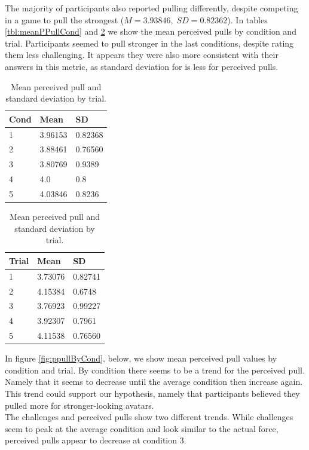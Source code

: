 
The majority of participants also reported pulling differently, despite competing in a game to pull the strongest ($ M=3.93846,\; SD=0.82362 $). In tables \ref{tbl:meanPPullCond} and \ref{tbl:meanPPullTrial} we show the mean perceived pulls by condition and trial. Participants seemed to pull stronger in the last conditions, despite rating them less challenging. It appears they were also more consistent with their answers in this metric, as standard deviation for is less for perceived pulls.

\begin{table}[H]
 \captionsetup{justification=centering,margin=0.1cm}
 \begin{minipage}{.5\linewidth}
     \centering
\begin{tabular}{|lll|}
\hline
Cond & Mean & SD \\
\hline
1 &  3.96153 & 0.82368\\  
2 &  3.88461 & 0.76560\\ 
3 &  3.80769 & 0.9389\\ 
4 &  4.0 & 0.8\\  
5 & 4.03846 & 0.8236\\  
\hline
\end{tabular}
\caption{Mean perceived pull and standard deviation by condition.}
\label{tbl:meanPPullCond}
\end{minipage}\hfill
 \begin{minipage}{.5\linewidth}
 \centering
\begin{tabular}{|lll|}
\hline
Trial & Mean & SD \\
\hline
1 & 3.73076 & 0.82741\\  
2 & 4.15384 & 0.6748\\  
3 & 3.76923 &  0.99227\\  
4 & 3.92307 & 0.7961\\  
5 & 4.11538 &  0.76560\\  
\hline
\end{tabular}
\caption{Mean perceived pull and standard deviation by trial.}
\label{tbl:meanPPullTrial}
\end{minipage}
\end{table} 

In figure \ref{fig:ppullByCond}, below, we show mean perceived pull values by condition and trial. By condition there seems to be a trend for the perceived pull. Namely that it seems to decrease until the average condition then increase again. This trend could support our hypothesis, namely that participants believed they pulled more for stronger-looking avatars. 
\\
The challenges and perceived pulls show two different trends. While challenges seem to peak at the average condition and look similar to the actual force, perceived pulls appear to decrease at condition 3.

